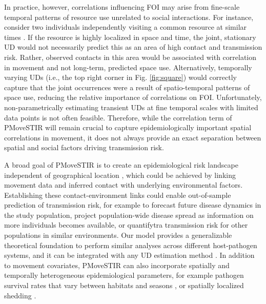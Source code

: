 \documentclass[letterpaper]{article}
\begin{document}
In practice, however, correlations influencing FOI may arise from fine-scale temporal patterns of resource use unrelated to social interactions. For instance, consider two individuals independently visiting a common resource at similar times \citep[e.g., a watering hole,][]{VanderWaal2017}. If the resource is highly localized in space and time, the joint, stationary UD would not necessarily predict this as an area of high contact and transmission risk. Rather, observed contacts in this area would be associated with correlation in movement and not long-term, predicted space use.
Alternatively, temporally varying UDs (i.e., the top right corner in Fig. \ref{fig:square}) would correctly capture that the joint occurrences were a result of spatio-temporal patterns of space use, reducing the relative importance of correlations on FOI. Unfortunately, non-parametrically estimating transient UDs at fine temporal scales with limited data points is not often feasible. Therefore, while the correlation term of PMoveSTIR will remain crucial to capture epidemiologically important spatial correlations in movement, it does not always provide an exact separation between spatial and social factors driving transmission risk.


A broad goal of PMoveSTIR is to create an epidemiological risk landscape independent of geographical location \citep{Merkle2018,Manlove2022}, which could be achieved by linking movement data and inferred contact with underlying environmental factors. Establishing these contact-environment links could enable out-of-sample prediction of transmission risk, for example to forecast future disease dynamics in the study population, project population-wide disease spread as information on more individuals becomes available, or quantifytra transmission risk for other populations in similar environments. Our model provides a generalizable theoretical foundation to perform similar analyses across different host-pathogen systems, and it can be integrated with any UD estimation method \citep{Signer2017,Merkle2018,Michelot2020,Potts2023}. In addition to movement covariates, PMoveSTIR can also incorporate spatially and temporally heterogeneous epidemiological parameters, for example pathogen survival rates that vary between habitats and seasons \citep{Daversa2017}, or spatially localized shedding \citep{Weinstein2018a}.

\end{document}
